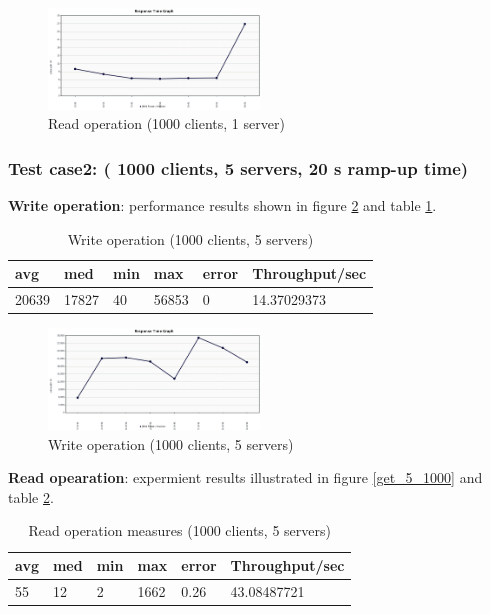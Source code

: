 \documentclass{sig-alternate}
\begin{document}
\begin{center}
\begin{figure}[ht!]
\centering
     \includegraphics[width=0.5\textwidth]{get_1_1000_response.png}
\caption{Read operation (1000 clients, 1 server) \label{get_1_1000}}
\end{figure}
\end{center}
\subsubsection{Test case2: ( 1000 clients, 5 servers, 20 s ramp-up time)}
 \textbf{Write operation}: performance results shown in figure \ref{put_5_1000} and table \ref{put_5_1000_tbl}.
\begin{table}[h]
\begin{tabular}{|l|l|l|l|l|l|}
\hline
\textbf{avg} & \textbf{med} & \textbf{min} & \textbf{max} & \textbf{error} & \textbf{Throughput/sec} \\ \hline
20639 & 17827 & 40 & 56853 & 0 & 14.37029373 \\ \hline
\end{tabular}\caption{Write operation (1000 clients, 5 servers)}\label{put_5_1000_tbl}
\end{table} 
 \begin{center}
\begin{figure}[ht!]
\centering
     \includegraphics[width=0.5\textwidth]{put_5_1000_response.png}
\caption{Write operation (1000 clients, 5 servers) \label{put_5_1000}}
\end{figure}
\end{center}
 \textbf{Read opearation}: expermient results illustrated in figure \ref{get_5_1000} and table \ref{get_5_1000_tbl}.
 \begin{table}[h]
\begin{tabular}{|l|l|l|l|l|l|}
\hline
\textbf{avg} & \textbf{med} & \textbf{min} & \textbf{max} & \textbf{error} & \textbf{Throughput/sec} \\ \hline
55 & 12 & 2 & 1662 & 0.26 & 43.08487721 \\ \hline
\end{tabular}\caption{Read operation measures (1000 clients, 5 servers)}\label{get_5_1000_tbl}
\end{table}
\end{document}
